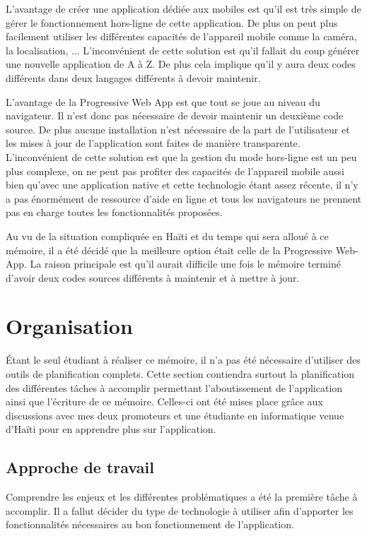 \documentclass{EPL-master-thesis-covers-FR}
\begin{document}
			L'avantage de créer une application dédiée aux mobiles est qu'il est très simple de gérer le fonctionnement hors-ligne de cette application. De plus on peut plus facilement utiliser les différentes capacités de l'appareil mobile comme la caméra, la localisation, ...
			L'inconvénient de cette solution est qu'il fallait du coup générer une nouvelle application de A à Z. De plus cela implique qu'il y aura deux codes différents dans deux langages différents à devoir maintenir.
				
			L'avantage de la Progressive Web App est que tout se joue au niveau du navigateur. Il n'est donc pas nécessaire de devoir maintenir un deuxième code source. De plus aucune installation n'est nécessaire de la part de l'utilisateur et les mises à jour de l'application sont faites de manière transparente.
			L'inconvénient de cette solution est que la gestion du mode hors-ligne est un peu plus complexe, on ne peut pas profiter des capacités de l'appareil mobile aussi bien qu'avec une application native et cette technologie étant assez récente, il n'y a pas énormément de ressource d'aide en ligne et tous les navigateurs ne prennent pas en charge toutes les fonctionnalités proposées.
				
			Au vu de la situation compliquée en Haïti et du temps qui sera alloué à ce mémoire, il a été décidé que la meilleure option était celle de la Progressive Web-App. La raison principale est qu'il aurait difficile une fois le mémoire terminé d'avoir deux codes sources différents à maintenir et à mettre à jour.

	\chapter{Organisation}
		

		Étant le seul étudiant à réaliser ce mémoire, il n'a pas été nécessaire d'utiliser des outils de planification complets. Cette section contiendra surtout la planification des différentes tâches à accomplir permettant l'aboutissement de l'application ainsi que l'écriture de ce mémoire. Celles-ci ont été mises place grâce aux discussions avec mes deux promoteurs et une étudiante en informatique venue d'Haïti pour en apprendre plus sur l'application. 

		\section{Approche de travail}
			Comprendre les enjeux et les différentes problématiques a été la première tâche à accomplir. Il a fallut décider du type de technologie à utiliser afin d'apporter les fonctionnalités nécessaires au bon fonctionnement de l'application. 
			
\end{document}
